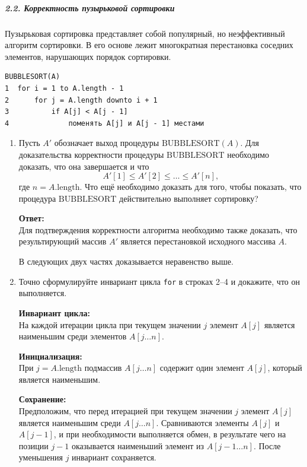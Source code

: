 \subparagraph{2.2. Корректность пузырьковой сортировки}

Пузырьковая сортировка представляет собой популярный, но неэффективный алгоритм сортировки. 
В его основе лежит многократная перестановка соседних элементов, нарушающих порядок сортировки.

\begin{verbatim}
BUBBLESORT(A)
1  for i = 1 to A.length - 1
2      for j = A.length downto i + 1
3          if A[j] < A[j - 1]
4              поменять A[j] и A[j - 1] местами
\end{verbatim}

\begin{enumerate}
    \item[а.] Пусть $A'$ обозначает выход процедуры $\text{BUBBLESORT}(A)$.
    Для доказательства корректности процедуры $\text{BUBBLESORT}$ необходимо доказать, что она завершается и что
    \[
    A'[1] \leq A'[2] \leq \dots \leq A'[n],
    \]
    где $n = A.\text{length}$.
    Что ещё необходимо доказать для того, чтобы показать, что процедура $\text{BUBBLESORT}$ действительно выполняет сортировку?

    \textbf{Ответ:} \\
    Для подтверждения корректности алгоритма необходимо также доказать,
    что результирующий массив $A'$ является перестановкой исходного массива $A$.

    В следующих двух частях доказывается неравенство выше.

    \item[б.] Точно сформулируйте инвариант цикла \texttt{for} в строках 2--4 и докажите, что он выполняется.

    \textbf{Инвариант цикла:} \\
    На каждой итерации цикла при текущем значении $j$
    элемент $A[j]$ является наименьшим среди элементов $A[j \ldots n]$.

    \textbf{Инициализация:} \\
    При $j = A.\text{length}$ подмассив $A[j \ldots n]$ содержит один элемент $A[j]$,
    который является наименьшим.

    \textbf{Сохранение:} \\
    Предположим, что перед итерацией при текущем значении $j$
    элемент $A[j]$ является наименьшим среди $A[j \ldots n]$.
    Сравниваются элементы $A[j]$ и $A[j-1]$, и при необходимости выполняется обмен,
    в результате чего на позиции $j-1$ оказывается наименьший элемент из $A[j-1 \ldots n]$.
    После уменьшения $j$ инвариант сохраняется.


\end{enumerate}
